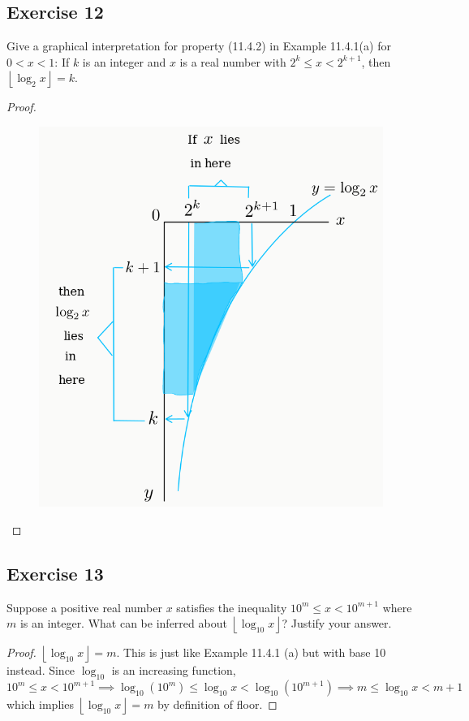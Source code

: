 \documentclass[14pt]{extarticle}
\newcommand{\floor}[1]{{\left\lfloor#1\right\rfloor}}
\begin{document}
\subsection{Exercise 12}
Give a graphical interpretation for property (11.4.2) in Example 11.4.1(a) for \(0 < x < 1\): If \(k\) is an integer 
and \(x\) is a real number with \(2^k \leq x < 2^{k + 1}\), then \(\floor{\log_2 x} = k\).

\begin{proof}
\begin{figure}[ht!]
\centering
\includegraphics[scale=0.4]{../images/11.4.12.png}
\end{figure}
\end{proof}

\subsection{Exercise 13}
Suppose a positive real number \(x\) satisfies the inequality \(10^m \leq x < 10^{m+1}\) where \(m\) is an integer. What can 
be inferred about \(\floor{\log_{10} x}\)? Justify your answer.

\begin{proof}
\(\floor{\log_{10} x} = m\). This is just like Example 11.4.1 (a) but with base 10 instead. Since \(\log_{10}\) is an 
increasing function, 
\[
10^m \leq x < 10^{m+1} \implies \log_{10}(10^m) \leq \log_{10}x < \log_{10}(10^{m+1}) \implies m \leq \log_{10}x < m+1
\]
which implies \(\floor{\log_{10} x} = m\) by definition of floor.
\end{proof}
\end{document}
